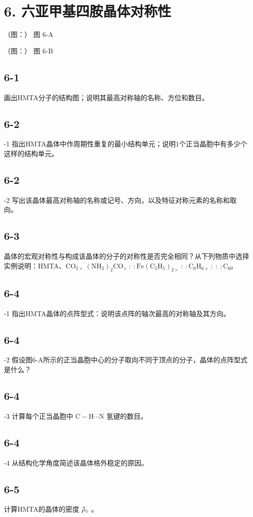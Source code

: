 \section*{6. 六亚甲基四胺晶体对称性}
（图：）
图 6-A

（图：）
图 6-B

\subsection*{6-1}
画出HMTA分⼦的结构图；说明其最⾼对称轴的名称、⽅位和数⽬。

\subsection*{6-2}
-1 指出HMTA晶体中作周期性重复的最⼩结构单元；说明1个正当晶胞中有多少个这样的结构单元。

\subsection*{6-2}
-2 写出该晶体最⾼对称轴的名称或记号、⽅向，以及特征对称元素的名称和取向。

\subsection*{6-3}
晶体的宏观对称性与构成该晶体的分⼦的对称性是否完全相同？从下列物质中选择实例说明：HMTA、$\mathrm { C O _ { 2 \times } \ ( N H _ { 2 } ) _ { 2 } C O _ { \times } \ : \ : F e ( C _ { 5 } H _ { 5 } ) _ { 2 \times } \ : \ : C _ { 6 } H _ { 6 \times } \ : \ : \ : C _ { 6 0 } }$

\subsection*{6-4}
-1 指出HMTA晶体的点阵型式：说明该点阵的轴次最⾼的对称轴及其⽅向。

\subsection*{6-4}
-2 假设图6-A所⽰的正当晶胞中⼼的分⼦取向不同于顶点的分⼦，晶体的点阵型式是什么？

\subsection*{6-4}
-3 计算每个正当晶胞中 $\mathrm { C - H \cdots N }$ 氢键的数⽬。

\subsection*{6-4}
-4 从结构化学⻆度简述该晶体格外稳定的原因。

\subsection*{6-5}
计算HMTA的晶体的密度 ${ \bf \dot { \rho } } _ { \circ }$ 。
